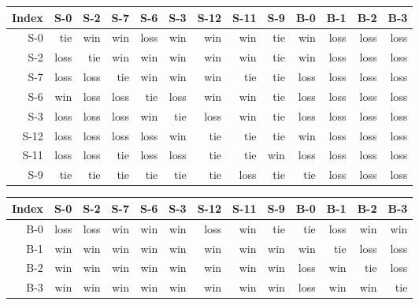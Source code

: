 \begin{tabular}{ | r | r | r | r | r | r | r | r | r | r | r | r | r | }
    \hline
        Index  &    S-0  &    S-2  &    S-7  &    S-6  &    S-3  &   S-12  &   S-11  &    S-9  &    B-0  &    B-1  &    B-2  &    B-3  \\
    \hline
    \hline
          S-0  &    tie  &    win  &    win  &   loss  &    win  &    win  &    win  &    tie  &    win  &   loss  &   loss  &   loss  \\
    \hline
          S-2  &   loss  &    tie  &    win  &    win  &    win  &    win  &    win  &    tie  &    win  &   loss  &   loss  &   loss  \\
    \hline
          S-7  &   loss  &   loss  &    tie  &    win  &    win  &    win  &    tie  &    tie  &   loss  &   loss  &   loss  &   loss  \\
    \hline
          S-6  &    win  &   loss  &   loss  &    tie  &   loss  &    win  &    win  &    tie  &   loss  &   loss  &   loss  &   loss  \\
    \hline
          S-3  &   loss  &   loss  &   loss  &    win  &    tie  &   loss  &    win  &    tie  &   loss  &   loss  &   loss  &   loss  \\
    \hline
         S-12  &   loss  &   loss  &   loss  &   loss  &    win  &    tie  &    tie  &    tie  &    win  &   loss  &   loss  &   loss  \\
    \hline
         S-11  &   loss  &   loss  &    tie  &   loss  &   loss  &    tie  &    tie  &    win  &   loss  &   loss  &   loss  &   loss  \\
    \hline
          S-9  &    tie  &    tie  &    tie  &    tie  &    tie  &    tie  &   loss  &    tie  &    tie  &   loss  &   loss  &   loss  \\
    \hline
\end{tabular}


\begin{tabular}{ | r | r | r | r | r | r | r | r | r | r | r | r | r | }
    \hline
        Index  &    S-0  &    S-2  &    S-7  &    S-6  &    S-3  &   S-12  &   S-11  &    S-9  &    B-0  &    B-1  &    B-2  &    B-3  \\
    \hline
    \hline
          B-0  &   loss  &   loss  &    win  &    win  &    win  &   loss  &    win  &    tie  &    tie  &   loss  &    win  &    win  \\
    \hline
          B-1  &    win  &    win  &    win  &    win  &    win  &    win  &    win  &    win  &    win  &    tie  &   loss  &   loss  \\
    \hline
          B-2  &    win  &    win  &    win  &    win  &    win  &    win  &    win  &    win  &   loss  &    win  &    tie  &   loss  \\
    \hline
          B-3  &    win  &    win  &    win  &    win  &    win  &    win  &    win  &    win  &   loss  &    win  &    win  &    tie  \\
    \hline
\end{tabular}


